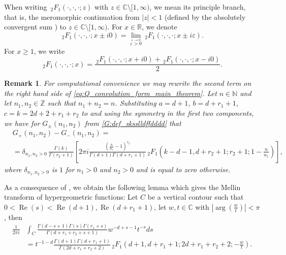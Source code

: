 \documentclass[]{article}
\newtheorem{remark}[thm]{Remark}
\renewcommand{\Re}{\operatorname{Re}}
\begin{document}
When writing $\, _2F_1(\cdot, \cdot, \cdot; z)$ with $z \in \mathbb{C} \setminus [1, \infty)$, we mean its principle branch, that is, the meromorphic continuation from $|z|<1$ (defined by the absolutely convergent sum \cite[15.2.1]{NIST}) to $z \in \mathbb{C} \setminus [1, \infty)$. For $x \in \mathbb{R}$, we denote 
\begin{equation}\label{eq:hypergeom_above_and_below_the_split}
    \, _2 F_1 (\cdot, \cdot, \cdot; x \pm i0)  = \lim_{  \stackrel{\varepsilon \to 0}{\varepsilon>0} }  \, _2 F_1 (\cdot, \cdot, \cdot; x \pm i \varepsilon).
\end{equation}
For $x \ge 1$, we write
\begin{equation}\label{def:2f1_positionevee}
    \, _2 F_1 (\cdot, \cdot, \cdot; x)  = \frac{    \, _2 F_1 (\cdot, \cdot, \cdot; x + i0) +     \, _2 F_1 (\cdot, \cdot, \cdot; x - i0)}{2}.
\end{equation}

\begin{remark}\label{rem:remark_on_difference_between_cuts} 
For computational convenience we may rewrite the second term on the right hand side of \eqref{eq:Q_convolution_form_main_theorem}. Let $n \in \mathbb{N}$ and let $n_1, n_2 \in \mathbb{Z}$ such that $n_1+n_2 = n$.
Substituting $a = d+1$, $b=d+r_1+1$, $c = k = 2d+2+r_1+r_2$ to \cite[15.2.3]{NIST} and using the symmetry in the first two components, we have for $G_\pm(n_1, n_2)$ from \eqref{G:def_sksslldffdddd} that 
    \begin{equation}
    \begin{split}
      &G_+(n_1, n_2) - G_-(n_1,n_2)  = \\
      &= \delta_{ n_1, n_2 > 0  } \, \frac{ \Gamma(k) }{\Gamma(r_2+1)} \left[  2  \pi i \frac{  (\frac{n}{n_1}-1)^{r_2} }{\Gamma (d+1) \Gamma (d+r_1+1)} \, _2F_1(k-d-1,d+r_2+1;r_2+1;1-\frac{n}{n_1})   \right],
    \end{split}
    \end{equation}
    where $\delta_{ n_1, n_2 > 0  }$ is $1$ for $n_1 > 0$ and $n_2 > 0$ and is equal to zero otherwise.
\end{remark}



As a consequence of \cite[Volume III, 2.21.1.1]{prud}, we obtain the following lemma  which gives the Mellin transform of hypergeometric functions: 
{\lem\label{lem:mellin1} Let $C$ be  a vertical contour such that $0<\Re(s)<\Re(d+1),\Re(d+r_1+1)$, let $w, t \in \mathbb{C}$ with $\left|\arg\left(\frac{w}{t}\right)\right|<\pi$, then 
\begin{equation} \label{eq:mellin_transform_hypergeometric_function}
\begin{split}
  \frac{1}{2 \pi i} &\int_C \frac{\Gamma (d-s+1) \Gamma (s)  \Gamma (r_1+s)}{\Gamma (d+r_1+r_2+s+1)} w^{-d+s-1} t^{-s} ds  \\
    &=  t^{-1-d} \frac{\Gamma (d+1) \Gamma (d+r_1+1)}{  \Gamma(2 d+r_1+r_2+2) }  \, _2 F_1\left(d+1,d+r_1+1;2 d+r_1+r_2+2;-\frac{w}{t}\right).
\end{split}
\end{equation} 
}
\end{document}
